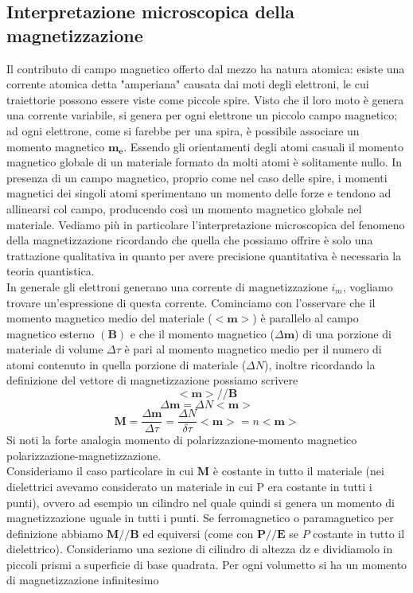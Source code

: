 \documentclass[
10pt, %
a4paper, %
oneside, %
headinclude,footinclude, %
BCOR5mm, %
]{scrartcl}
\begin{document}
\subsection{Interpretazione microscopica della magnetizzazione}
Il contributo di campo magnetico offerto dal mezzo ha natura atomica: esiste una corrente atomica detta "amperiana" causata dai moti degli elettroni, le cui traiettorie possono essere viste come piccole spire. Visto che il loro moto è genera una corrente variabile, si genera per ogni elettrone un piccolo campo magnetico; ad ogni elettrone, come si farebbe per una spira, è possibile associare un momento magnetico \(\mathbf{m_e}\). Essendo gli orientamenti degli atomi casuali il momento magnetico globale di un materiale formato da molti atomi è solitamente nullo. In presenza di un campo magnetico, proprio come nel caso delle spire, i momenti magnetici dei singoli atomi sperimentano un momento delle forze e tendono ad allinearsi col campo, producendo così un momento magnetico globale nel materiale. Vediamo più in particolare l'interpretazione microscopica del fenomeno della magnetizzazione ricordando che quella che possiamo offrire è solo una trattazione qualitativa in quanto per avere precisione quantitativa è necessaria la teoria quantistica.\\
In generale gli elettroni generano una corrente di magnetizzazione \(i_m\), vogliamo trovare un'espressione di questa corrente. Cominciamo con l'osservare che il momento magnetico  medio del materiale (\(<\mathbf{m}>\)) è parallelo al campo magnetico esterno \((\mathbf{B})\) e che il momento magnetico (\(\Delta\mathbf{m}\)) di una porzione di materiale di volume \(\Delta \tau\) è pari al momento magnetico medio per il numero di atomi contenuto in quella porzione di materiale (\(\Delta N\)), inoltre ricordando la definizione del vettore di magnetizzazione possiamo scrivere
\[<\mathbf{m}>//\mathbf{B}\]
\[\Delta \mathbf{m}=\Delta N<\mathbf{m>}\]
\[\mathbf{M}=\frac{\Delta \mathbf{m}}{\Delta \tau}=\frac{\Delta N }{\delta \tau}<\mathbf{m}>=n<\mathbf{m}>\]
Si noti la forte analogia momento di polarizzazione-momento magnetico polarizzazione-magnetizzazione.\\
Consideriamo il caso particolare in cui \(\mathbf{M}\) è costante in tutto il materiale (nei dielettrici avevamo considerato un materiale in cui P era costante in tutti i punti), ovvero ad esempio un cilindro nel quale quindi si genera un momento di magnetizzazione uguale in tutti i punti. Se ferromagnetico o paramagnetico per definizione abbiamo \(\mathbf{M}//\mathbf{B}\) ed equiversi (come con \(\mathbf{P}//\mathbf{E}\) se \(P\) costante in tutto il dielettrico). Consideriamo una sezione di cilindro di altezza dz e dividiamolo in piccoli prismi a superficie di base quadrata. Per ogni volumetto si ha un momento di magnetizzazione infinitesimo
\end{document}
